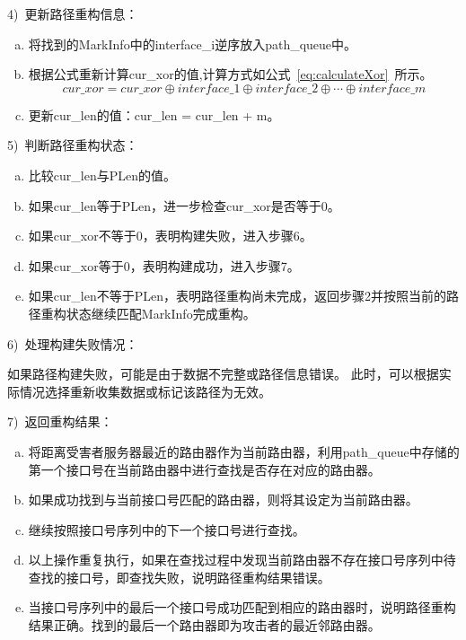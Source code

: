 4)~更新路径重构信息：\par
\begin{enumerate}[a.]
	\item 将找到的MarkInfo中的interface\_i逆序放入path\_queue中。
	\item 根据公式重新计算cur\_xor的值,计算方式如公式~\ref{eq:calculateXor}~所示。
	      \begin{equation}
		      \label{eq:calculateXor}
		      cur\_xor = cur\_xor \oplus interface\_1 \oplus interface\_2 \oplus \cdots \oplus interface\_m
	      \end{equation}
	\item 更新cur\_len的值：cur\_len = cur\_len + m。
\end{enumerate}

5)~判断路径重构状态：\par
\begin{enumerate}[a.]
	\item 比较cur\_len与PLen的值。
	\item 如果cur\_len等于PLen，进一步检查cur\_xor是否等于0。
	\item 如果cur\_xor不等于0，表明构建失败，进入步骤6。
	\item 如果cur\_xor等于0，表明构建成功，进入步骤7。
	\item 如果cur\_len不等于PLen，表明路径重构尚未完成，返回步骤2并按照当前的路径重构状态继续匹配MarkInfo完成重构。
\end{enumerate}


6)~处理构建失败情况：\par
如果路径构建失败，可能是由于数据不完整或路径信息错误。
此时，可以根据实际情况选择重新收集数据或标记该路径为无效。\par

7)~返回重构结果：\par
\begin{enumerate}[a.]
	\item 将距离受害者服务器最近的路由器作为当前路由器，利用path\_queue中存储的第一个接口号在当前路由器中进行查找是否存在对应的路由器。
	\item 如果成功找到与当前接口号匹配的路由器，则将其设定为当前路由器。
	\item 继续按照接口号序列中的下一个接口号进行查找。
	\item 以上操作重复执行，如果在查找过程中发现当前路由器不存在接口号序列中待查找的接口号，即查找失败，说明路径重构结果错误。
	\item 当接口号序列中的最后一个接口号成功匹配到相应的路由器时，说明路径重构结果正确。找到的最后一个路由器即为攻击者的最近邻路由器。
\end{enumerate}

